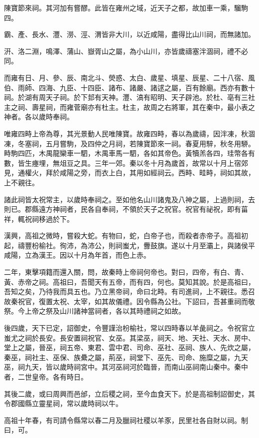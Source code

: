陳寶節來祠。其河加有嘗醪。此皆在雍州之域，近天子之都，故加車一乘，騮駒四。

霸、產、長水、灃、澇、涇、渭皆非大川，以近咸陽，盡得比山川祠，而無諸加。

汧、洛二淵，鳴澤、蒲山、嶽胥山之屬，為小山川，亦皆歲禱塞泮涸祠，禮不必同。

而雍有日、月、參、辰、南北斗、熒惑、太白、歲星、填星、辰星、二十八宿、風伯、雨師、四海、九臣、十四臣、諸布、諸嚴、諸逑之屬，百有餘廟。西亦有數十祠。於湖有周天子祠。於下邽有天神。灃、滈有昭明、天子辟池。於杜、亳有三社主之祠、壽星祠，而雍菅廟亦有杜主。杜主，故周之右將軍，其在秦中，最小表之神者。各以歲時奉祠。

唯雍四畤上帝為尊，其光景動人民唯陳寶。故雍四畤，春以為歲禱，因泮凍，秋涸凍，冬塞祠，五月嘗駒，及四仲之月祠，若陳寶節來一祠。春夏用騂，秋冬用駵。畤駒四匹，木禺龍欒車一駟，木禺車馬一駟，各如其帝色。黃犢羔各四，珪幣各有數，皆生瘞埋，無俎豆之具。三年一郊。秦以冬十月為歲首，故常以十月上宿郊見，通權火，拜於咸陽之旁，而衣上白，其用如經祠云。西畤、畦畤，祠如其故，上不親往。

諸此祠皆太祝常主，以歲時奉祠之。至如他名山川諸鬼及八神之屬，上過則祠，去則已。郡縣遠方神祠者，民各自奉祠，不領於天子之祝官。祝官有祕祝，即有菑祥，輒祝祠移過於下。

漢興，高祖之微時，嘗殺大蛇。有物曰，蛇，白帝子也，而殺者赤帝子。高祖初起，禱豐枌榆社。徇沛，為沛公，則祠蚩尤，釁鼓旗。遂以十月至灞上，與諸侯平咸陽，立為漢王。因以十月為年首，而色上赤。

二年，東擊項籍而還入關，問，故秦時上帝祠何帝也。對曰，四帝，有白、青、黃、赤帝之祠。高祖曰，吾聞天有五帝，而有四，何也。莫知其說。於是高祖曰，吾知之矣，乃待我而具五也。乃立黑帝祠，命曰北畤。有司進祠，上不親往。悉召故秦祝官，復置太祝、太宰，如其故儀禮。因令縣為公社。下詔曰，吾甚重祠而敬祭。今上帝之祭及山川諸神當祠者，各以其時禮祠之如故。

後四歲，天下已定，詔御史，令豐謹治枌榆社，常以四時春以羊彘祠之。令祝官立蚩尤之祠於長安。長安置祠祝官、女巫。其梁巫，祠天、地、天社、天水、房中、堂上之屬，晉巫，祠五帝、東君、雲中君、司命、巫社、巫祠、族人、先炊之屬，秦巫，祠社主、巫保、族纍之屬，荊巫，祠堂下、巫先、司命、施糜之屬，九天巫，祠九天，皆以歲時祠宮中。其河巫祠河於臨晉，而南山巫祠南山秦中。秦中者，二世皇帝。各有時日。

其後二歲，或曰周興而邑邰，立后稷之祠，至今血食天下。於是高祖制詔御史，其令郡國縣立靈星祠，常以歲時祠以牛。

高祖十年春，有司請令縣常以春二月及臘祠社稷以羊豕，民里社各自財以祠。制曰，可。

